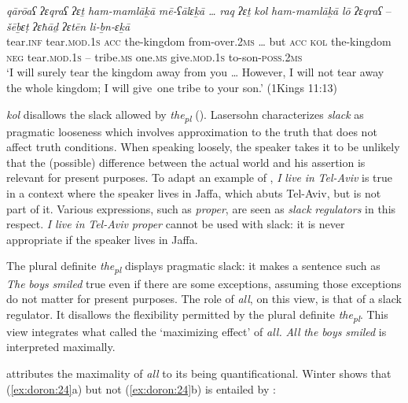 \documentclass[output=paper]{langsci/langscibook}
\begin{document}
\ea%
    \label{ex:doron:23}
    \gll \textit{qārōaʕ}   \textit{ʔɛqraʕ}          \textit{ʔɛṯ}   \textit{ham-mamlāḵā}   \textit{mē-ʕālɛḵā} \textit{…} \textit{raq} \textit{ʔɛṯ}   \textit{kol}   \textit{ham-mamlāḵā} \textit{lō}      \textit{ʔɛqraʕ}          –   \textit{šēḇɛṭ}      \textit{ʔɛħāḏ}    \textit{ʔɛtēn}               \textit{li-ḇn-ɛḵā}\\
         tear.\textsc{inf}  tear.\textsc{mod.1s} \textsc{acc} the-kingdom     from-over.2\textsc{ms} \textsc{…} but \textsc{acc} \textsc{kol} the-kingdom    \textsc{neg}  tear.\textsc{mod.1s}  –   tribe\textsc{.ms} one.\textsc{ms}  give.\textsc{mod.1s}   to-son-\textsc{poss.2ms}\\
    \glt `I will surely tear the kingdom away from you … However, I will not tear away the whole kingdom; I will give~one tribe to your son.' (1Kings 11:13)
    \z

\textit{kol} disallows the slack allowed by \textit{the\textsubscript{pl}} (\citealt{Krifka2006,Lasersohn1999,Schwarz2013}). Lasersohn characterizes \textit{slack} as pragmatic looseness which involves approximation to the truth that does not affect truth conditions. When speaking loosely, the speaker takes it to be unlikely that the (possible) difference between the actual world and his assertion is relevant for present purposes. To adapt an example of \citet{Lauer2012}, \textit{I} \textit{live} \textit{in} \textit{Tel-Aviv} is true in a context where the speaker lives in Jaffa, which abuts Tel-Aviv, but is not part of it. Various expressions, such as \textit{proper}, are seen as \textit{slack} \textit{regulators} in this respect. \textit{I} \textit{live} \textit{in} \textit{Tel-Aviv} \textit{proper} cannot be used with slack: it is never appropriate if the speaker lives in Jaffa.

The plural definite \textit{the\textsubscript{pl}} displays pragmatic slack: it makes a sentence such as \textit{The} \textit{boys} \textit{smiled} true even if there are some exceptions, assuming those exceptions do not matter for present purposes. The role of \textit{all}, on this view, is that of a slack regulator. It disallows the flexibility permitted by the plural definite \textit{the\textsubscript{pl}}. This view integrates what \citet{Dowty1987} called the ‘maximizing effect’ of \textit{all.} \textit{All} \textit{the} \textit{boys} \textit{smiled} is interpreted maximally.\largerpage

\citet{Winter2001} attributes the maximality of \textit{all} to its being quantificational. Winter shows that (\ref{ex:doron:24}a) but not (\ref{ex:doron:24}b) is entailed by :
\end{document}
